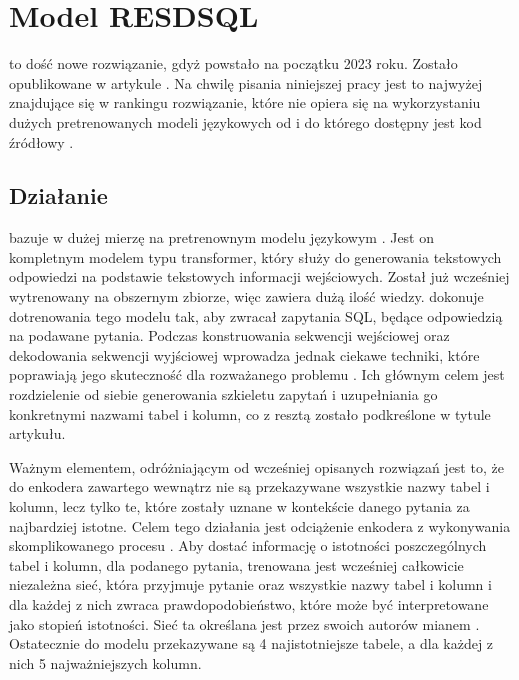 \section{Model RESDSQL}
 to dość nowe rozwiązanie, gdyż powstało na początku 2023 roku. Zostało opublikowane w artykule  . Na chwilę pisania niniejszej pracy jest to najwyżej znajdujące się w rankingu  rozwiązanie, które nie opiera się na wykorzystaniu dużych pretrenowanych modeli językowych od  i do którego dostępny jest kod źródłowy .

\subsection{Działanie}
 bazuje w dużej mierzę na pretrenownym modelu językowym  . Jest on kompletnym modelem typu transformer, który służy do generowania tekstowych odpowiedzi na podstawie tekstowych informacji wejściowych. Został już wcześniej wytrenowany na obszernym zbiorze, więc zawiera dużą ilość wiedzy.  dokonuje dotrenowania tego modelu tak, aby zwracał zapytania SQL, będące odpowiedzią na podawane pytania. Podczas konstruowania sekwencji wejściowej oraz dekodowania sekwencji wyjściowej wprowadza jednak ciekawe techniki, które poprawiają jego skuteczność dla rozważanego problemu . Ich głównym celem jest rozdzielenie od siebie generowania szkieletu zapytań i uzupełniania go konkretnymi nazwami tabel i kolumn, co z resztą zostało podkreślone w tytule artykułu.

Ważnym elementem, odróżniającym  od wcześniej opisanych rozwiązań jest to, że do enkodera zawartego wewnątrz  nie są przekazywane wszystkie nazwy tabel i kolumn, lecz tylko te, które zostały uznane w kontekście danego pytania za najbardziej istotne. Celem tego działania jest odciążenie enkodera z wykonywania skomplikowanego procesu . Aby dostać informację o istotności poszczególnych tabel i kolumn, dla podanego pytania, trenowana jest wcześniej całkowicie niezależna sieć, która przyjmuje pytanie oraz wszystkie nazwy tabel i kolumn i dla każdej z nich zwraca prawdopodobieństwo, które może być interpretowane jako stopień istotności. Sieć ta określana jest przez swoich autorów mianem . Ostatecznie do modelu  przekazywane są 4 najistotniejsze tabele, a dla każdej z nich 5 najważniejszych kolumn.

